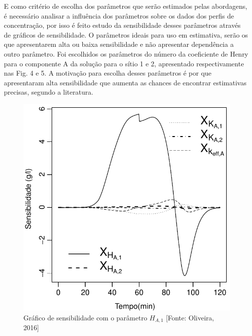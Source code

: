 \documentclass[por]{Template_SBEF}
\begin{document}
E como critério de escolha dos parâmetros que serão estimados pelas abordagens, é necessário analisar a influência dos parâmetros sobre os dados dos perfis de concentração, por isso é feito estudo da sensibilidade desses parâmetros através de gráficos de sensibilidade\cite{claudir_tese}. O parâmetros ideais para uso em estimativa, serão os que apresentarem alta ou baixa sensibilidade e não apresentar dependência a outro parâmetro\cite{lugon}. Foi escolhidos os parâmetros do número da coeficiente de Henry para o componente A da solução para o sítio 1 e 2, apresentado respectivamente nas Fig. 4 e 5. A motivação para escolha desses parâmetros é por que apresentaram alta sensibilidade que aumenta as chances de encontrar estimativas precisas, segundo a literatura\cite{vasconcelos}. 


\begin{figure}[H] 
	\centering
	\includegraphics[width=.8\columnwidth]{Arquivos/SensibilidadeCa-all.pdf} 
	\caption{Gráfico de sensibilidade com o parâmetro $H_{A,1}$ [Fonte: Oliveira, 2016]} 
\end{figure}
\end{document}
